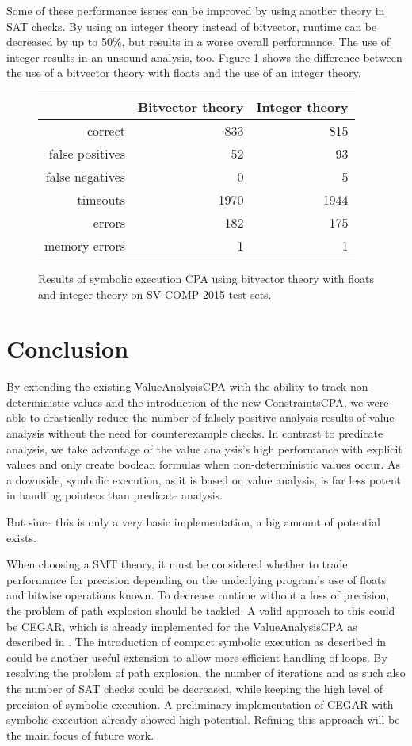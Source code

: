 Some of these performance issues can be improved by using another theory in SAT checks.
By using an integer theory instead of bitvector, runtime can be decreased by up to 50\%, but results in a worse overall performance.
The use of integer results in an unsound analysis, too. Figure \ref{bitvecIntComp} shows the difference between the use of a bitvector theory with floats and the use of an integer theory.
\begin{figure}
\begin{tabular}{| r || r | r |}
\hline
& Bitvector theory & Integer theory \\ \hline
correct         &  833 &  815 \\ \hline
false positives &   52 &   93 \\ \hline
false negatives &    0 &    5 \\ \hline
timeouts        & 1970 & 1944 \\ \hline
errors          &  182 &  175 \\ \hline
memory errors   &    1 &    1 \\ \hline
\end{tabular}
\caption{Results of symbolic execution CPA using bitvector theory with floats and integer theory on SV-COMP 2015 test sets.}
\label{bitvecIntComp}
\end{figure}

\section{Conclusion}
By extending the existing ValueAnalysisCPA with the ability to track non-deterministic values and the introduction of the new ConstraintsCPA,
we were able to drastically reduce the number of falsely positive analysis results of value analysis without the need for counterexample checks.
In contrast to predicate analysis, we take advantage of the value analysis's high performance with explicit values and only create boolean formulas when non-deterministic values occur.
As a downside, symbolic execution, as it is based on value analysis, is far less potent in handling pointers than predicate analysis.

But since this is only a very basic implementation, a big amount of potential exists.

When choosing a SMT theory,
it must be considered whether to trade performance for precision depending on the underlying program's use of floats and bitwise operations known.
To decrease runtime without a loss of precision, the problem of path explosion should be tackled.
A valid approach to this could be CEGAR, which is already implemented for the ValueAnalysisCPA as described in \cite{Beyer2013}.
The introduction of compact symbolic execution as described in \cite{Slaby2013} could be another useful extension to allow more efficient handling of loops.
By resolving the problem of path explosion, the number of iterations and as such also the number of SAT checks could be decreased, while keeping the high level of precision of symbolic execution.
A preliminary implementation of CEGAR with symbolic execution already showed high potential.
Refining this approach will be the main focus of future work.
